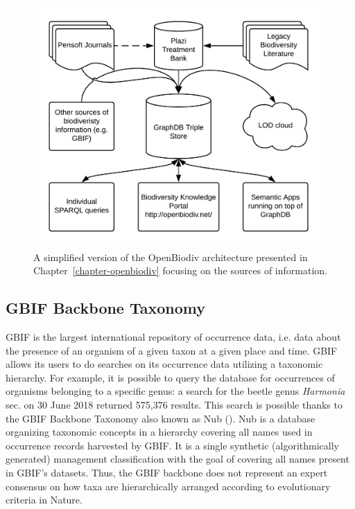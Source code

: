 \begin{figure}
\centering
\includegraphics[width=\textwidth]{Figures/openbiodiv-sources-simple}
\decoRule
\caption{A simplified version of the OpenBiodiv architecture presented in Chapter~\ref{chapter-openbiodiv} focusing on the sources of information.}
\label{fig:openbiodiv-sources-simple}
\end{figure}


\subsection{GBIF Backbone Taxonomy}

GBIF is the largest international repository of occurrence data, i.e. data about the presence of an organism of a given taxon at a given place and time. GBIF allows its users to do searches on its occurrence data utilizing a taxonomic hierarchy. For example, it is possible to query the database  for occurrences of organisms belonging to a specific genus: a search for the beetle genus \textit{Harmonia} sec. \cite{gbif_secretariat_gbif_2017-1} on 30 June 2018 returned 575,376 results. This search is possible thanks to the GBIF Backbone Taxonomy also known as Nub (\cite{gbif_secretariat_gbif_2017-1}). Nub is a database organizing taxonomic concepts in a hierarchy covering all names used in occurrence records harvested by GBIF.  It is a single synthetic (algorithmically generated) management classification with the goal of covering all names present in GBIF's datasets. Thus, the GBIF backbone does not represent an expert consensus on how taxa are hierarchically arranged according to evolutionary criteria in Nature.

